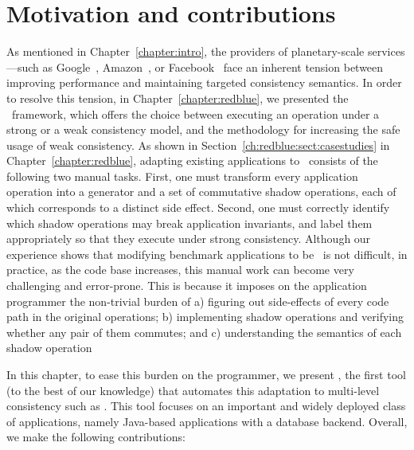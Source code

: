 \section{Motivation and contributions}
\label{ch:sieve:sect:motivation}

As mentioned in Chapter~\ref{chapter:intro}, the providers of
planetary-scale services---such as Google~\cite{GoogleWeb}, Amazon~\cite{AmazonWeb}, or Facebook~\cite{FacebookWeb}
face an inherent tension between improving performance and maintaining targeted consistency
semantics. In order to resolve this tension, in Chapter~\ref{chapter:redblue}, we presented
the \RBCN\ framework, which offers the choice between executing an operation under a strong or a weak
consistency model, and the methodology for increasing the safe usage of weak consistency. 
As shown in Section~\ref{ch:redblue:sect:casestudies} in Chapter~\ref{chapter:redblue},
adapting existing applications to \RBCN\ consists of the following
two manual tasks. First, one must transform every application operation into a generator and a
set of commutative shadow operations, each of which corresponds to a distinct
side effect. Second, one must correctly
identify which shadow operations may break application invariants,
and label them appropriately so that they execute under strong consistency.
Although our experience shows that modifying benchmark applications
to be \RBCAJ\ is not difficult, in practice, as the code base increases, this manual work can 
become very challenging and error-prone. This is because it
imposes on the application programmer the non-trivial burden of
a) figuring out side-effects of every code path in the original operations;
b) implementing shadow operations and verifying whether any pair of them commutes; and c)
understanding the semantics of each shadow operation  

In this chapter, to ease this burden on the programmer,
we present \tool, the first tool (to the best of our knowledge) that automates
this adaptation to multi-level consistency such as \RBCN. This tool focuses on
an important and widely deployed class of applications, namely
Java-based applications with a database backend. Overall, we make the following contributions:

